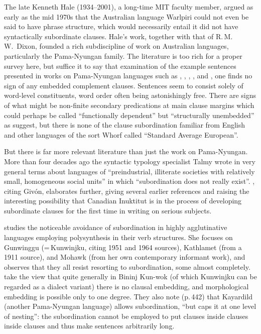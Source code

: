 \documentclass[output=paper,colorlinks,citecolor=brown
]{langscibook}
\begin{document}
The late Kenneth Hale (1934--2001), a long-time MIT faculty member,
argued as early as the mid 1970s that the Australian language Warlpiri
could not even be said to have phrase structure, which would necessarily
entail it did not have syntactically subordinate clauses. Hale's work,
together with that of R.\,M.\,W.\ Dixon, founded a rich subdiscipline
of work on Australian languages, particularly the Pama-Nyungan family.
The literature is too rich for a proper survey here, but suffice it to
say that examination of the example sentences presented in works on
Pama-Nyungan languages such as \citet{Hale76}, \citet{Nash80},
\citet{Dixon81}, \citet{AustBres96}, and \citet{Pensalfini04},
one finds no sign of any embedded complement clauses. Sentences
seem to consist solely of word-level constituents, word order often
being astonishingly free. There are signs of what might be non-finite
secondary predications at main clause margins which could perhaps be
called ``functionally dependent'' but ``structurally unembedded'' as
\citet[228, esp.\ n.\,13]{AustBres96} suggest,
but there is none of the clause subordination familiar from English
and other languages of the sort Whorf called ``Standard Average European''.

But there is far more relevant literature than just the work on
Pama-Nyungan. More than four decades ago the syntactic typology
specialist Talmy \citet[298]{Givon79} wrote in very
general terms about languages of ``preindustrial, illiterate societies
with relatively small, homogeneous social units'' in which
``subordination does not really exist''. \citet[esp.\ pp.\,157--159]{Kalmar85}, citing Giv{\'o}n, elaborates further, giving
several earlier references and raising the interesting possibility
that Canadian Inuktitut is in the process of developing subordinate
clauses for the first time in writing on serious subjects.

\citet{Mithun84} studies the noticeable avoidance of subordination
in highly agglutinative languages employing polysynthesis in their
verb structures. She focuses on Gunwinggu (=\,Kunwinjku, citing 1951
and 1964 sources), Kathlamet (from a 1911 source), and Mohawk (from
her own contemporary informant work), and observes that they all
resist resorting to subordination, some almost completely. \citet[Section~6]{EvanLevi09} take the view that quite
generally in Bininj Kun-wok (of which Kunwinjku can be regarded as a
dialect variant) there is no clausal embedding, and morphological
embedding is possible only to one degree. They also note (p.\,442)
that Kayardild (another Pama-Nyungan language) allows subordination,
``but caps it at one level of nesting'': the subordination cannot be
employed to put clauses inside clauses inside clauses and thus make
sentences arbitrarily long.
\end{document}
